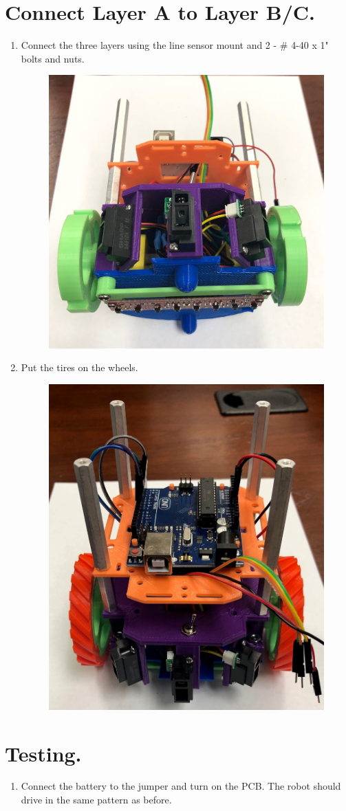 \documentclass{handout}
\begin{document}
	\section{Connect Layer A to Layer B/C.}
	\begin{enumerate}
		\item Connect the three layers using the line sensor mount and 2 - \# 4-40 x 1" bolts and nuts.
		
		\begin{figure} [H]
			\centering
			\includegraphics[width=.45\textwidth]{9.jpg}
		\end{figure}
		
		\item Put the tires on the wheels.
		
		\begin{figure} [H]
			\centering
			\includegraphics[width=.45\textwidth]{10.jpg}
		\end{figure}
		
	\end{enumerate}

	\section{Testing.}
	\begin{enumerate}
		\item Connect the battery to the jumper and turn on the PCB. The robot should drive in the same pattern as before.
	\end{enumerate}
		
		
	
	\newpage
	\clearpage
	\pagebreak
	
\end{document}
